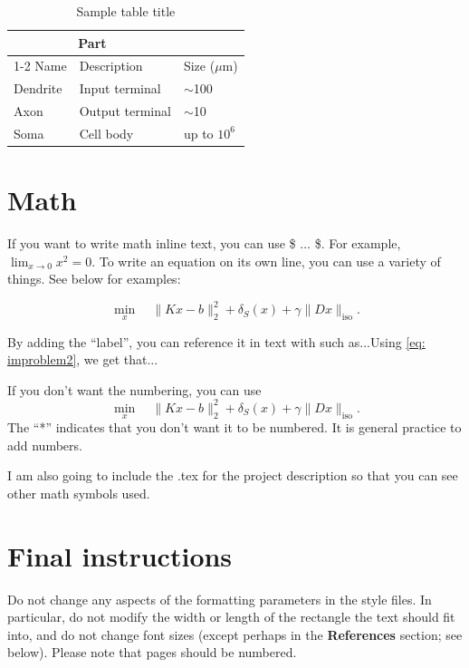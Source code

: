 \documentclass{article}
\begin{document}
\begin{table}
  \caption{Sample table title}
  \label{sample-table}
  \centering
  \begin{tabular}{lll}
    \toprule
    \multicolumn{2}{c}{Part}                   \\
    \cmidrule(r){1-2}
    Name     & Description     & Size ($\mu$m) \\
    \midrule
    Dendrite & Input terminal  & $\sim$100     \\
    Axon     & Output terminal & $\sim$10      \\
    Soma     & Cell body       & up to $10^6$  \\
    \bottomrule
  \end{tabular}
\end{table}

\section{Math}
If you want to write math inline text, you can use \$ $\hdots$ \$. For
example, $\lim_{x \to 0} x^2 = 0$. To write an equation on its own
line, you can use a variety of things. See below for examples:

\begin{equation} \label{eq: improblem2} 
\min_x \quad \| Kx-b \|^2_2 + \delta_S(x) + \gamma \|Dx \|_{\text{iso}}. 
\end{equation}

By adding the ``label'', you can reference it in text with such
as...Using \eqref{eq: improblem2}, we get that...

If you don't want the numbering, you can use
\begin{equation*} 
\min_x \quad \| Kx-b \|^2_2 + \delta_S(x) + \gamma \|Dx \|_{\text{iso}}. 
\end{equation*}
The ``*'' indicates that you don't want it to be numbered. It is
general practice to add numbers.

I am also going to include the .tex for the project description so
that you can see other math symbols used. 

\section{Final instructions}


Do not change any aspects of the formatting parameters in the style files.  In
particular, do not modify the width or length of the rectangle the text should
fit into, and do not change font sizes (except perhaps in the
\textbf{References} section; see below). Please note that pages should be
numbered.
\end{document}
